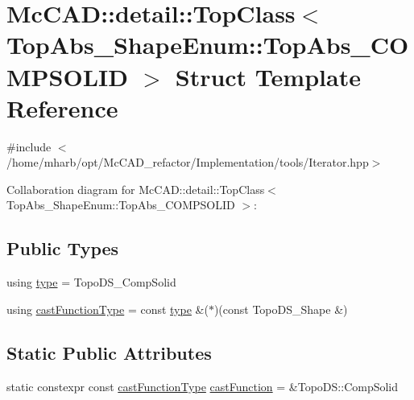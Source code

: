 \hypertarget{structMcCAD_1_1detail_1_1TopClass_3_01TopAbs__ShapeEnum_1_1TopAbs__COMPSOLID_01_4}{}\section{Mc\+C\+AD\+:\+:detail\+:\+:Top\+Class$<$ Top\+Abs\+\_\+\+Shape\+Enum\+:\+:Top\+Abs\+\_\+\+C\+O\+M\+P\+S\+O\+L\+ID $>$ Struct Template Reference}
\label{structMcCAD_1_1detail_1_1TopClass_3_01TopAbs__ShapeEnum_1_1TopAbs__COMPSOLID_01_4}


{\ttfamily \#include $<$/home/mharb/opt/\+Mc\+C\+A\+D\+\_\+refactor/\+Implementation/tools/\+Iterator.\+hpp$>$}



Collaboration diagram for Mc\+C\+AD\+:\+:detail\+:\+:Top\+Class$<$ Top\+Abs\+\_\+\+Shape\+Enum\+:\+:Top\+Abs\+\_\+\+C\+O\+M\+P\+S\+O\+L\+ID $>$\+:
\subsection*{Public Types}
\begin{DoxyCompactItemize}
\item 
using \hyperlink{structMcCAD_1_1detail_1_1TopClass_3_01TopAbs__ShapeEnum_1_1TopAbs__COMPSOLID_01_4_a9255dacb2f0f62babf1ac9439492e20b}{type} = Topo\+D\+S\+\_\+\+Comp\+Solid
\item 
using \hyperlink{structMcCAD_1_1detail_1_1TopClass_3_01TopAbs__ShapeEnum_1_1TopAbs__COMPSOLID_01_4_a110312d2c20be779990d50a4ca68b71f}{cast\+Function\+Type} = const \hyperlink{structMcCAD_1_1detail_1_1TopClass_3_01TopAbs__ShapeEnum_1_1TopAbs__COMPSOLID_01_4_a9255dacb2f0f62babf1ac9439492e20b}{type} \&($\ast$)(const Topo\+D\+S\+\_\+\+Shape \&)
\end{DoxyCompactItemize}
\subsection*{Static Public Attributes}
\begin{DoxyCompactItemize}
\item 
static constexpr const \hyperlink{structMcCAD_1_1detail_1_1TopClass_3_01TopAbs__ShapeEnum_1_1TopAbs__COMPSOLID_01_4_a110312d2c20be779990d50a4ca68b71f}{cast\+Function\+Type} \hyperlink{structMcCAD_1_1detail_1_1TopClass_3_01TopAbs__ShapeEnum_1_1TopAbs__COMPSOLID_01_4_aded68662c34809c62d09790d02be9305}{cast\+Function} = \&Topo\+D\+S\+::\+Comp\+Solid
\end{DoxyCompactItemize}


